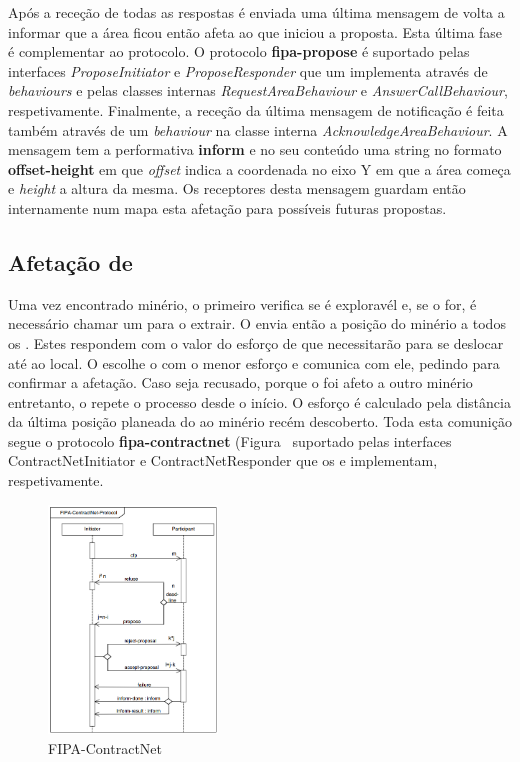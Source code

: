 \documentclass[12pt]{report}
\begin{document}
Após a receção de todas as respostas é enviada uma última mensagem de volta a informar que a área ficou então afeta ao \spotter que iniciou a proposta. Esta última fase é complementar ao protocolo.
O protocolo \textbf{fipa-propose} é suportado pelas interfaces \emph{ProposeInitiator} e \emph{ProposeResponder} que um \spotter implementa através de \emph{behaviours} e pelas classes internas 
\emph{RequestAreaBehaviour} e \emph{AnswerCallBehaviour}, respetivamente.
Finalmente, a receção da última mensagem de notificação é feita também através de um \emph{behaviour} na classe interna \emph{AcknowledgeAreaBehaviour}. A mensagem tem a performativa \textbf{inform} e
no seu conteúdo uma string no formato \textbf{offset-height} em que \emph{offset} indica a coordenada no eixo Y em que a área começa e \emph{height} a altura da mesma. Os receptores desta mensagem
guardam então internamente num mapa esta afetação para possíveis futuras propostas.


\FloatBarrier
\subsection{Afetação de \producers}
Uma vez encontrado minério, o \spotter primeiro verifica se é exploravél e, se o for, é necessário chamar um \producer para o extrair. O \spotter envia então a posição do minério a todos os \producers. 
Estes respondem com o valor do esforço de que necessitarão para se deslocar até ao local. O \spotter escolhe o \producer com o menor esforço e comunica com ele, pedindo para confirmar a afetação. 
Caso seja recusado, porque o \producer foi afeto a outro minério entretanto, o \spotter repete o processo desde o início. O esforço é calculado pela distância da última posição planeada do \producer
ao minério recém descoberto.
Toda esta comunição segue o protocolo \textbf{fipa-contractnet} (Figura~ suportado pelas interfaces ContractNetInitiator e ContractNetResponder que os \spotters e \producers implementam, respetivamente.

\begin{figure}[h]
	\centering
    \includegraphics[width=0.4\textwidth]{fipa-contract-net}
	\caption{FIPA-ContractNet}
	\label{fipa-contract-net}
\end{figure}
\end{document}
